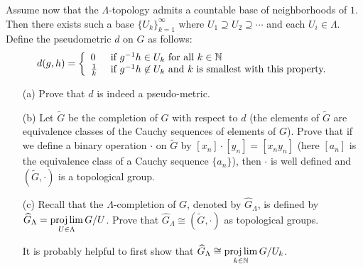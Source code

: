 \documentclass[12pt]{amsart}
\begin{document}
Assume now that the $\Lambda$-topology admits a countable base of neighborhoods of $1$. Then there exists such a base $\{U_k\}_{k=1}^{\infty}$
where $U_1\supseteq U_2\supseteq \cdots$ and each $U_i\in\Lambda$. Define the pseudometric $d$ on $G$ as follows:
$$d(g,h)=\left\{
\begin{array}{ll}
0 & \mbox{ if }g^{-1}h\in U_k \mbox{ for all } k\in{\mathbb N}\\
\frac{1}{k} &  \mbox{ if }g^{-1}h\not \in U_k \mbox{ and } k \mbox{ is smallest with this property.}
\end{array}
\right.
$$
\begin{itemize}
\item[(a)] Prove that $d$ is indeed a pseudo-metric.
\item[(b)] Let $\widetilde G$ be the completion of $G$ with respect to $d$ (the elements of $\widetilde G$ are equivalence classes
of the Cauchy sequences of elements of $G$). Prove that if we define a binary operation $\cdot$ on $\widetilde G$
by $[x_n]\cdot[y_n]=[x_n y_n]$ (here $[a_n]$ is the equivalence class of a Cauchy sequence $\{a_n\}$), then $\cdot$ is well defined
and $(\widetilde G,\cdot)$ is a topological group.
\item[(c)] Recall that the $\Lambda$-completion of $G$, denoted by $\widehat G_{\Lambda}$, is defined by
${\widehat G}_{\Lambda}=\projlim\limits_{U\in \Lambda} G/U$. Prove that ${\widehat G}_{\Lambda}\cong (\widetilde G,\cdot)$ as topological groups.

 It is probably helpful to first show that ${\widehat G}_{\Lambda}\cong \projlim\limits_{k\in{\mathbb N}} G/U_k$.
\end{itemize}
\end{document}
